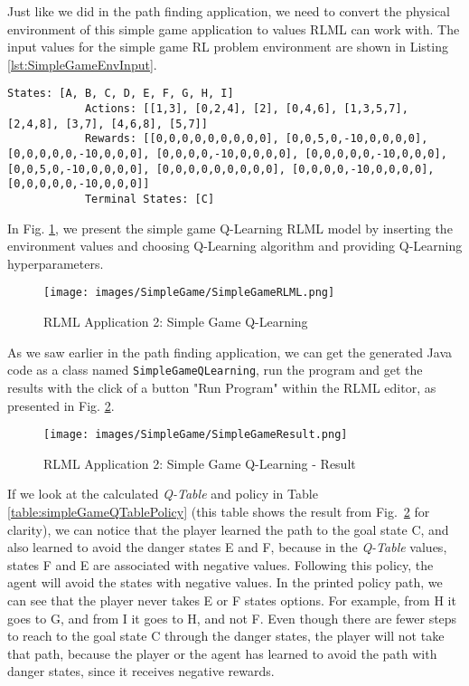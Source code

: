 \documentclass[11pt,letterpaper]{ryersonSGSThesis}
\begin{document}
\begin{ryersonSGSThesis}
    Just like we did in the path finding application, we need to convert the physical environment of this simple game application to values RLML can work with. The input values for the simple game RL problem environment are shown in Listing \ref{lst:SimpleGameEnvInput}.
    
    \begin{minipage}{\linewidth}
        \begin{lstlisting}[caption={The Input Values for Simple Game Environment.},label={lst:SimpleGameEnvInput}]
            States: [A, B, C, D, E, F, G, H, I]
            Actions: [[1,3], [0,2,4], [2], [0,4,6], [1,3,5,7], [2,4,8], [3,7], [4,6,8], [5,7]]
            Rewards: [[0,0,0,0,0,0,0,0,0], [0,0,5,0,-10,0,0,0,0], [0,0,0,0,0,-10,0,0,0], [0,0,0,0,-10,0,0,0,0], [0,0,0,0,0,-10,0,0,0], [0,0,5,0,-10,0,0,0,0], [0,0,0,0,0,0,0,0,0], [0,0,0,0,-10,0,0,0,0], [0,0,0,0,0,-10,0,0,0]]
            Terminal States: [C]
        \end{lstlisting} 
    \end{minipage}
    
    In Fig. \ref{fig:SimpleGameRLML}, we present the simple game Q-Learning RLML model by inserting the environment values and choosing Q-Learning algorithm and providing Q-Learning hyperparameters.
    
    \begin{figure}[!tbh]
        \centering
        \texttt{[image: images/SimpleGame/SimpleGameRLML.png]}
        \caption{RLML Application 2: Simple Game Q-Learning}
        \label{fig:SimpleGameRLML}
    \end{figure} 
    
    As we saw earlier in the path finding application, we can get the generated Java code as a class named \texttt{SimpleGameQLearning}, run the program and get the results with the click of a button "Run Program" within the RLML editor, as presented in Fig. \ref{fig:SimpleGameResult}.
    
    \begin{figure}[!tbh]
        \centering
        \texttt{[image: images/SimpleGame/SimpleGameResult.png]}
        \caption{RLML Application 2: Simple Game Q-Learning - Result}
        \label{fig:SimpleGameResult}
    \end{figure} 
    
    If we look at the calculated \emph{Q-Table} and policy in Table \ref{table:simpleGameQTablePolicy} (this table
    shows the result from Fig.~\ref{fig:SimpleGameResult} for clarity), we can notice that the player learned the path to the goal state C, and also learned to avoid the danger states E and F, because in the \emph{Q-Table} values, states F and E are associated with negative values. Following this policy, the agent will avoid the states with negative values. In the printed policy path, we can see that the player never takes E or F states options. For example, from H it goes to G, and from I it goes to H, and not F. Even though there are fewer steps to reach to the goal state C through the danger states, the player will not take that path, because the player or the agent has learned to avoid the path with danger states, since it receives negative rewards.


\end{ryersonSGSThesis}
\end{document}
